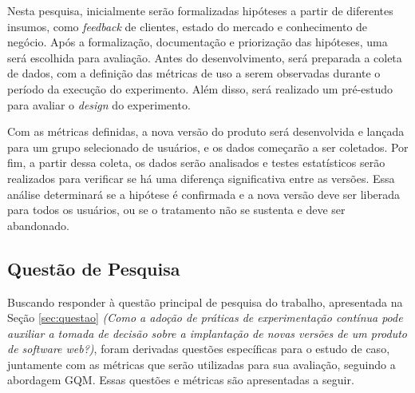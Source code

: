 Nesta pesquisa, inicialmente serão formalizadas hipóteses a partir de diferentes insumos, como \textit{feedback} de clientes, estado do mercado e conhecimento de negócio. Após a formalização, documentação e priorização das hipóteses, uma será escolhida para avaliação. Antes do desenvolvimento, será preparada a coleta de dados, com a definição das métricas de uso a serem observadas durante o período da execução do experimento. Além disso, será realizado um pré-estudo para avaliar o \textit{design} do experimento.

Com as métricas definidas, a nova versão do produto será desenvolvida e lançada para um grupo selecionado de usuários, e os dados começarão a ser coletados. Por fim, a partir dessa coleta, os dados serão analisados e testes estatísticos serão realizados para verificar se há uma diferença significativa entre as versões. Essa análise determinará se a hipótese é confirmada e a nova versão deve ser liberada para todos os usuários, ou se o tratamento não se sustenta e deve ser abandonado.


\subsection{Questão de Pesquisa}



Buscando responder à questão principal de pesquisa do trabalho, apresentada na Seção \ref{sec:questao} \textit{(Como a adoção de práticas de experimentação contínua pode auxiliar a tomada de decisão sobre a implantação de novas versões de um produto de software web?)}, foram derivadas questões específicas para o estudo de caso, juntamente com as métricas que serão utilizadas para sua avaliação, seguindo a abordagem GQM. Essas questões e métricas são apresentadas a seguir.


